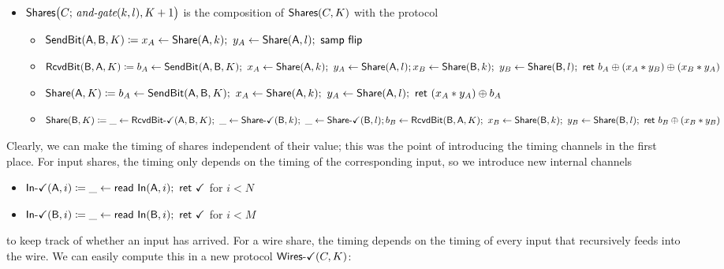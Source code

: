 \begin{itemize}
\item $\mathsf{Shares}\big(C; \, \textit{and-gate}(k,l),K+1\big)$ is the composition of $\mathsf{Shares}(C,K)$ with the protocol
\begin{itemize}
\item $\SendBit(\A,\B,K) \coloneqq x_A \leftarrow \Share(\A,k); \ y_A \leftarrow \Share(\A,l); \ \samp{\flip}$
\item $\mathsf{RcvdBit}(\mathsf{B},\mathsf{A},K) \coloneqq b_A \leftarrow \mathsf{SendBit}(\mathsf{A},\mathsf{B},K); \ x_A \leftarrow \mathsf{Share}(\mathsf{A},k); \ y_A \leftarrow \mathsf{Share}(\mathsf{A},l); \\ x_B \leftarrow \mathsf{Share}(\mathsf{B},k); \ y_B \leftarrow \mathsf{Share}(\mathsf{B},l); \ \mathsf{ret} \ b_A \oplus (x_A * y_B) \oplus (x_B * y_A)$
\item $\mathsf{Share}(\mathsf{A},K) \coloneqq b_A \leftarrow \mathsf{SendBit}(\mathsf{A},\mathsf{B},K); \ x_A \leftarrow \mathsf{Share}(\mathsf{A},k); \ y_A \leftarrow \mathsf{Share}(\mathsf{A},l); \ \mathsf{ret} \ (x_A * y_A) \oplus b_A$
\item $\mathsf{Share}(\mathsf{B},K) \coloneqq \_ \leftarrow \mathsf{RcvdBit}\textsf{-}\checkmark(\mathsf{A},\mathsf{B},K); \ \_ \leftarrow \mathsf{Share}\textsf{-}\checkmark(\mathsf{B},k); \ \_ \leftarrow \mathsf{Share}\textsf{-}\checkmark(\mathsf{B},l); \\ b_B \leftarrow \mathsf{RcvdBit}(\mathsf{B},\mathsf{A},K); \ x_B \leftarrow \mathsf{Share}(\mathsf{B},k); \ y_B \leftarrow \mathsf{Share}(\mathsf{B},l); \ \mathsf{ret} \ b_B \oplus (x_B * y_B)$
\end{itemize}
\end{itemize}

\noindent Clearly, we can make the timing of shares independent of their value; this was the point of introducing the timing channels in the first place. For input shares, the timing only depends on the timing of the corresponding input, so we introduce new internal channels
\begin{itemize}
\item {\color{teal} $\mathsf{In}\textsf{-}\checkmark(\mathsf{A},i) \coloneqq \_ \leftarrow \mathsf{read} \ \mathsf{In}(\mathsf{A},i); \ \mathsf{ret} \ \checkmark$ for $i < N$}
\item {\color{teal} $\mathsf{In}\textsf{-}\checkmark(\mathsf{B},i) \coloneqq \_ \leftarrow \mathsf{read} \ \mathsf{In}(\mathsf{B},i); \ \mathsf{ret} \ \checkmark$ for $i < M$}
\end{itemize}
to keep track of whether an input has arrived. For a wire share, the timing depends on the timing of every input that recursively feeds into the wire. We can easily compute this in a new protocol $\mathsf{Wires}\textsf{-}\checkmark(C,K)$:

